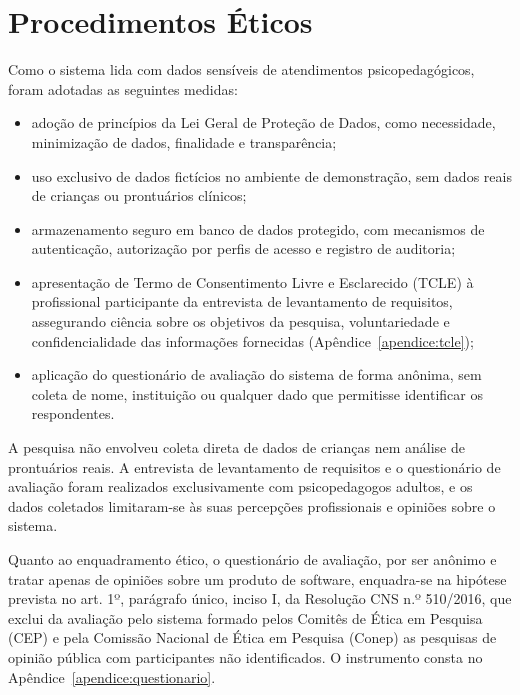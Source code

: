 \section{Procedimentos Éticos}\label{sec:etica}

Como o sistema lida com dados sensíveis de atendimentos psicopedagógicos, foram adotadas as seguintes medidas:

\begin{itemize}
    \item adoção de princípios da Lei Geral de Proteção de Dados, como necessidade, minimização de dados, finalidade e transparência;
    \item uso exclusivo de dados fictícios no ambiente de demonstração, sem dados reais de crianças ou prontuários clínicos;
    \item armazenamento seguro em banco de dados protegido, com mecanismos de autenticação, autorização por perfis de acesso e registro de auditoria;
    \item apresentação de Termo de Consentimento Livre e Esclarecido (TCLE) à profissional participante da entrevista de levantamento de requisitos, assegurando ciência sobre os objetivos da pesquisa, voluntariedade e confidencialidade das informações fornecidas (Apêndice~\ref{apendice:tcle});
    \item aplicação do questionário de avaliação do sistema de forma anônima, sem coleta de nome, instituição ou qualquer dado que permitisse identificar os respondentes.
\end{itemize}

A pesquisa não envolveu coleta direta de dados de crianças nem análise de prontuários reais. A entrevista de levantamento de requisitos e o questionário de avaliação foram realizados exclusivamente com psicopedagogos adultos, e os dados coletados limitaram-se às suas percepções profissionais e opiniões sobre o sistema.

Quanto ao enquadramento ético, o questionário de avaliação, por ser anônimo e tratar apenas de opiniões sobre um produto de software, enquadra-se na hipótese prevista no art. 1º, parágrafo único, inciso I, da Resolução CNS n.º 510/2016, que exclui da avaliação pelo sistema formado pelos Comitês de Ética em Pesquisa (CEP) e pela Comissão Nacional de Ética em Pesquisa (Conep) as pesquisas de opinião pública com participantes não identificados. O instrumento consta no Apêndice~\ref{apendice:questionario}.

